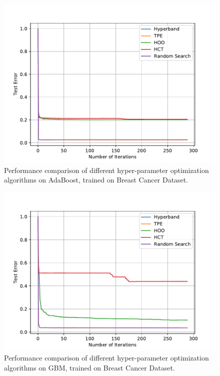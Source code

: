 \documentclass[runningheads,a4paper]{llncs}
\begin{document}
\begin{figure}[ht]
    \centering
    \includegraphics[scale=0.8]{img/uci/ada_1.pdf}
    \caption{Performance comparison of different hyper-parameter optimization algorithms on AdaBoost, trained on Breast Cancer Dataset.}
    \label{ada_1}
\end{figure}

\begin{figure}[ht]
    \centering
    \includegraphics[scale=0.8]{img/uci/gbm_1.pdf}
    \caption{Performance comparison of different hyper-parameter optimization algorithms on GBM, trained on Breast Cancer Dataset.}
    \label{gbm_1}
\end{figure}
\end{document}
